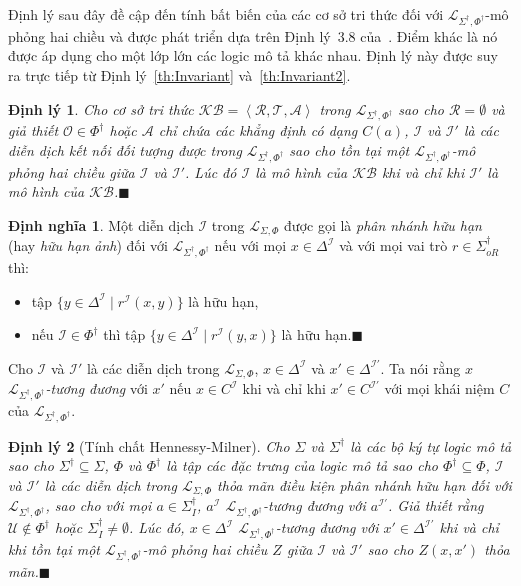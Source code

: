 \documentclass[12pt,a4paper,twoside]{report}
\newcommand{\mL}		{\mathcal{L}}
\newcommand{\mA}		{\mathcal{A}}
\newcommand{\mT}		{\mathcal{T}}
\newcommand{\mR}		{\mathcal{R}}
\newcommand{\mI}		{\mathcal{I}}
\newcommand{\mO}		{\mathcal{O}}
\newcommand{\mU}		{\mathcal{U}}
\newcommand{\SigmaDag}	{\Sigma^\dag}
\newcommand{\SigmaDagI}	{\Sigma^\dag_I}
\newcommand{\SigmaDagOR}{\Sigma^\dag_{oR}}
\newcommand{\PhiDag}	{\Phi^\dag}
\newcommand{\KB}		{\mathcal{KB}}
\newcommand{\mLSP}		{\mL_{\Sigma,\Phi}}
\newcommand{\mLSPD}		{\mL_{\Sigma^\dag,\Phi^\dag}}
\newcommand{\myend}		{\mbox{}\hfill\mbox{{\scriptsize$\!\blacksquare$}}}
\newcommand{\tuple}[1]	{\left\langle#1\right\rangle\!}
\newtheorem{Theorem}{Định lý}[chapter]
\theoremstyle{definition}
\newtheorem{Definition}{Định nghĩa}[chapter]
\begin{document}
Định lý sau đây đề cập đến tính bất biến của các cơ sở tri thức đối với $\mLSPD$-mô phỏng hai chiều và được phát triển dựa trên Định lý~3.8 của~\cite{Divroodi2011B}. Điểm khác là nó được áp dụng cho một lớp lớn các logic mô tả khác nhau. Định lý này được suy ra trực tiếp từ Định lý~\ref{th:Invariant} và~\ref{th:Invariant2}.

\begin{Theorem}
Cho cơ sở tri thức $\KB = \tuple{\mR, \mT, \mA}$ trong $\mLSPD$ sao cho $\mR = \emptyset$ và giả thiết $\mO \in \PhiDag$ hoặc $\mA$ chỉ chứa các khẳng định có dạng $C(a)$, $\mI$ và $\mI'$ là các diễn dịch kết nối đối tượng được trong $\mLSPD$ sao cho tồn tại một $\mLSPD$-mô phỏng hai chiều giữa $\mI$ và $\mI'$. Lúc đó $\mI$ là mô hình của $\KB$ khi và chỉ khi $\mI'$ là mô hình của $\KB$.\myend
\end{Theorem}

\begin{Definition}
Một diễn dịch $\mI$ trong $\mLSP$ được gọi là {\em phân nhánh hữu hạn} (hay {\em hữu hạn ảnh}) đối với $\mLSPD$ nếu với mọi $x \in \Delta^\mI$ và với mọi vai trò $r \in \SigmaDagOR$ thì:
\begin{itemize}
  \item tập $\{y \in \Delta^\mI \mid r^\mI(x,y)\}$ là hữu hạn,
  
  \item nếu $\mI \in \PhiDag$ thì tập $\{y \in \Delta^\mI \mid r^\mI(y, x)\}$ là hữu hạn.\myend
\end{itemize}
\end{Definition}

Cho $\mI$ và $\mI'$ là các diễn dịch trong $\mLSP$, $x \in \Delta^\mI$ và $x' \in \Delta^{\mI'}$. Ta nói rằng $x$ {\em $\mLSPD$-tương đương} với $x'$ nếu $x \in C^\mI$ khi và chỉ khi $x' \in C^{\mI'}$ với mọi khái niệm $C$ của $\mLSPD$.

\begin{Theorem}[Tính chất Hennessy-Milner]
\label{th:HMP}
Cho $\Sigma$ và $\SigmaDag$ là các bộ ký tự logic mô tả sao cho $\SigmaDag \subseteq \Sigma$, $\Phi$ và $\PhiDag$ là tập các đặc trưng của logic mô tả sao cho $\PhiDag \subseteq \Phi$, $\mI$ và $\mI'$ là các diễn dịch trong $\mLSP$ thỏa mãn điều kiện phân nhánh hữu hạn đối với $\mLSPD$, sao cho với mọi $a \in \SigmaDagI$, $a^\mI$ $\mLSPD$-tương đương với $a^{\mI'}$. Giả thiết rằng $\mU \not \in \PhiDag$ hoặc $\SigmaDagI \not= \emptyset$. Lúc đó, $x \in \Delta^\mI$ $\mLSPD$-tương đương với $x' \in \Delta^{\mI'}$ khi và chỉ khi tồn tại một $\mLSPD$-mô phỏng hai chiều $Z$ giữa $\mI$ và $\mI'$ sao cho $Z(x, x')$ thỏa mãn.\myend
\end{Theorem}
\end{document}
